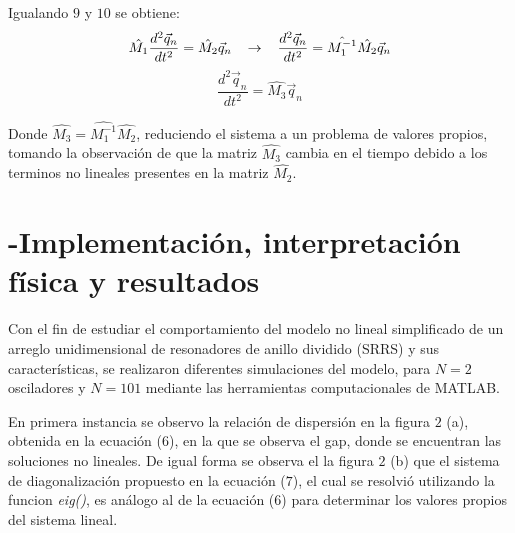 \documentclass[11pt,letterpaper,twocolumn]{article}
\begin{document}
Igualando $9$ y $10$ se obtiene: 
$$\hat{M_{1}} \dfrac{d^{2} \vec{q}_{n}}{dt^{2}} = \hat{M_{2}} \vec{q}_{n} \hspace*{0.3 cm} \rightarrow \hspace*{0.3 cm}\dfrac{d^{2} \vec{q}_{n}}{dt^{2}} = \hat{M_{1}^{-1}} \hat{M_{2}} \vec{q}_{n} $$
\begin{equation}
\dfrac{d^{2} \vec{q}_{n}}{dt^{2}}=\hat{M_{3}} \vec{q}_{n}
\end{equation}
\par 
Donde $\hat{M_{3}}=\hat{M_{1}^{-1}} \hat{M_{2}}$, reduciendo el sistema a un problema de valores propios, tomando la observación de que la matriz $\hat{M_{3}}$ cambia en el tiempo debido a los terminos no lineales  presentes en la matriz $\hat{M_{2}}$.
\section*{-Implementación, interpretación física y resultados}
Con el fin de estudiar el comportamiento del modelo no lineal simplificado de un arreglo unidimensional de resonadores de anillo dividido (SRR\textquotesingle S) y sus características, se realizaron diferentes simulaciones del modelo, para $N=2$ osciladores y $N=101$ mediante las herramientas computacionales de MATLAB.\\
\par 
En primera instancia se observo la relación de dispersión en la figura $2$ (a), obtenida en la ecuación ($6$), en la que se observa el gap, donde se encuentran las soluciones no lineales. De igual forma se observa el la figura $2$ (b) que el sistema de diagonalización propuesto en la ecuación ($7$), el cual se resolvió utilizando la funcion \textit{eig()}, es análogo al de la ecuación ($6$) para determinar los valores propios del sistema lineal. \\  
\end{document}
